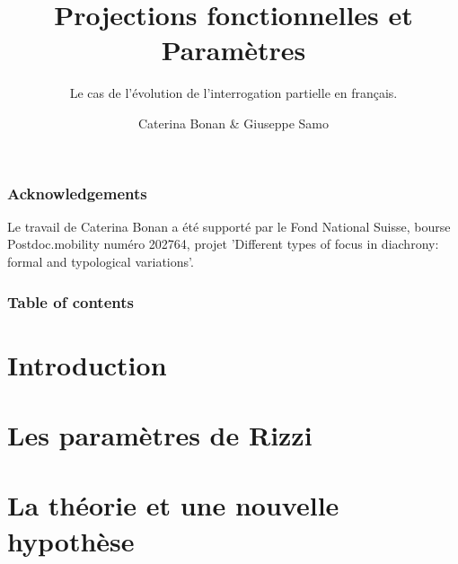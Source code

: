 \documentclass[aspectratio=169, sectionpages, codemintedoverleaf, bibref]{beamer}
\title{Projections fonctionnelles et Paramètres}
\subtitle{Le cas de l'évolution de l'interrogation partielle en français.}
\author{Caterina Bonan \& Giuseppe Samo}
\institute{University of Cambridge; Université de Genève \& BLCU.}
\begin{document}
\titlepage

\begin{frame}
    \frametitle{Acknowledgements}
    \begin{center}
        Le travail de Caterina Bonan a été supporté par le Fond National Suisse, bourse Postdoc.mobility numéro 202764, projet 'Different types of focus in diachrony: formal and typological variations'.
    \end{center}
\end{frame}

\begin{frame}
	\frametitle{Table of contents}
	\tableofcontents
\end{frame}

\section{Introduction}



\section{Les paramètres de Rizzi}




\section{La théorie et une nouvelle hypothèse}


\end{document}
